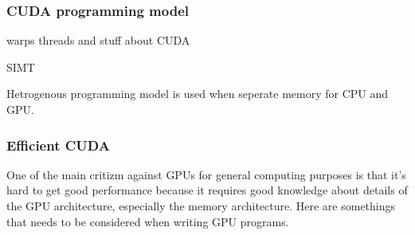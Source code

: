 \documentclass[10pt,a4paper]{article}
\begin{document}
\subsubsection{CUDA programming model}
warps threads and stuff about CUDA

SIMT

Hetrogenous programming model is used when seperate memory for CPU and GPU.

\subsubsection{Efficient CUDA}
One of the main critizm against GPUs for general computing purposes is that it's hard to get good performance because it requires good knowledge about details of the GPU architecture, especially the memory architecture. Here are somethings that needs to be considered when writing GPU programs.\cite{plink_gpu, cuda, cuda_best_practice}
\\
\end{document}
